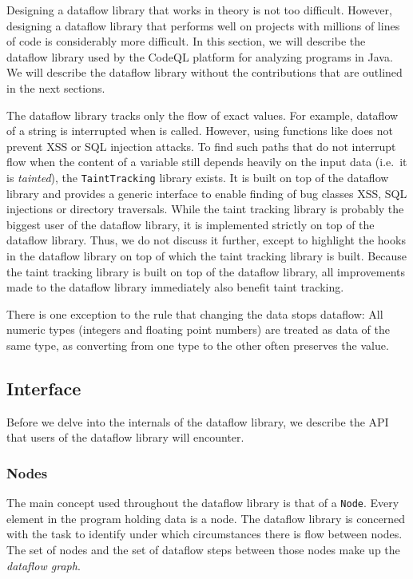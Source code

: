 Designing a dataflow library that works in theory is not too difficult.
However, designing a dataflow library that performs well on projects with 
millions of lines of code is considerably more difficult.
In this section, we will describe the dataflow library used by the CodeQL platform %
for analyzing programs in Java.
We will describe the dataflow library without the contributions that are outlined 
in the next sections.

The dataflow library tracks only the flow of exact values.
For example, dataflow of a string is interrupted when  is called.
However, using functions like  does not prevent XSS or SQL 
injection attacks. To find such paths that do not interrupt flow when the
content of a variable still depends heavily on the input data 
(i.e.\ it is \emph{tainted}), the \texttt{TaintTracking} library exists.
It is built on top of the dataflow library and provides a generic interface to enable
finding of bug classes XSS, SQL injections or directory traversals.
While the taint tracking library is probably the biggest user of the dataflow library,
it is implemented strictly on top of the dataflow library.
Thus, we do not discuss it further, except to highlight the hooks in the dataflow 
library on top of which the taint tracking library is built.
Because the taint tracking library is built on top of the dataflow library,
 all improvements made to the dataflow library immediately also benefit taint tracking.

There is one exception to the rule that changing the data stops dataflow: All numeric types 
(integers and floating point numbers) are treated as data of the same type,
as converting from one type to the other often preserves the value.


\subsection{Interface}
Before we delve into the internals of the dataflow library, we describe the API 
that users of the dataflow library will encounter.

\subsubsection*{Nodes}
The main concept used throughout the dataflow library is that of a \texttt{Node}.
Every element in the program holding data is a node.
The dataflow library is concerned with the task to identify 
under which circumstances there is flow between nodes.
The set of nodes and the set of dataflow steps between those nodes make up the 
\emph{dataflow graph}.

